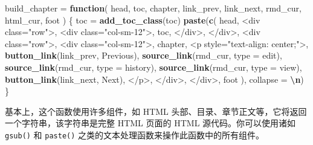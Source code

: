 \documentclass[
  12pt,
]{krantz}
\newenvironment{Shaded}{\begin{snugshade}}{\end{snugshade}}
\newcommand{\AttributeTok}[1]{\textcolor[rgb]{0.13,0.29,0.53}{#1}}
\newcommand{\ControlFlowTok}[1]{\textcolor[rgb]{0.13,0.29,0.53}{\textbf{#1}}}
\newcommand{\FunctionTok}[1]{\textcolor[rgb]{0.13,0.29,0.53}{\textbf{#1}}}
\newcommand{\NormalTok}[1]{#1}
\newcommand{\OtherTok}[1]{\textcolor[rgb]{0.56,0.35,0.01}{#1}}
\newcommand{\SpecialCharTok}[1]{\textcolor[rgb]{0.81,0.36,0.00}{\textbf{#1}}}
\newcommand{\StringTok}[1]{\textcolor[rgb]{0.31,0.60,0.02}{#1}}
\theoremstyle{definition}
\theoremstyle{definition}
\theoremstyle{definition}
\theoremstyle{definition}
\theoremstyle{remark}
\begin{document}
\begin{Shaded}
\begin{Highlighting}[]
\NormalTok{build\_chapter }\OtherTok{=} \ControlFlowTok{function}\NormalTok{(}
\NormalTok{  head, toc, chapter, link\_prev, link\_next, rmd\_cur, html\_cur, foot}
\NormalTok{) \{}
\NormalTok{  toc }\OtherTok{=} \FunctionTok{add\_toc\_class}\NormalTok{(toc)}
  \FunctionTok{paste}\NormalTok{(}\FunctionTok{c}\NormalTok{(}
\NormalTok{    head,}
    \StringTok{\textquotesingle{}\textless{}div class="row"\textgreater{}\textquotesingle{}}\NormalTok{,}
    \StringTok{\textquotesingle{}\textless{}div class="col{-}sm{-}12"\textgreater{}\textquotesingle{}}\NormalTok{,}
\NormalTok{    toc,}
    \StringTok{\textquotesingle{}\textless{}/div\textgreater{}\textquotesingle{}}\NormalTok{,}
    \StringTok{\textquotesingle{}\textless{}/div\textgreater{}\textquotesingle{}}\NormalTok{,}
    \StringTok{\textquotesingle{}\textless{}div class="row"\textgreater{}\textquotesingle{}}\NormalTok{,}
    \StringTok{\textquotesingle{}\textless{}div class="col{-}sm{-}12"\textgreater{}\textquotesingle{}}\NormalTok{,}
\NormalTok{    chapter,}
    \StringTok{\textquotesingle{}\textless{}p style="text{-}align: center;"\textgreater{}\textquotesingle{}}\NormalTok{,}
    \FunctionTok{button\_link}\NormalTok{(link\_prev, }\StringTok{\textquotesingle{}Previous\textquotesingle{}}\NormalTok{),}
    \FunctionTok{source\_link}\NormalTok{(rmd\_cur, }\AttributeTok{type =} \StringTok{\textquotesingle{}edit\textquotesingle{}}\NormalTok{),}
    \FunctionTok{source\_link}\NormalTok{(rmd\_cur, }\AttributeTok{type =} \StringTok{\textquotesingle{}history\textquotesingle{}}\NormalTok{),}
    \FunctionTok{source\_link}\NormalTok{(rmd\_cur, }\AttributeTok{type =} \StringTok{\textquotesingle{}view\textquotesingle{}}\NormalTok{),}
    \FunctionTok{button\_link}\NormalTok{(link\_next, }\StringTok{\textquotesingle{}Next\textquotesingle{}}\NormalTok{),}
    \StringTok{\textquotesingle{}\textless{}/p\textgreater{}\textquotesingle{}}\NormalTok{,}
    \StringTok{\textquotesingle{}\textless{}/div\textgreater{}\textquotesingle{}}\NormalTok{,}
    \StringTok{\textquotesingle{}\textless{}/div\textgreater{}\textquotesingle{}}\NormalTok{,}
\NormalTok{    foot}
\NormalTok{  ), }\AttributeTok{collapse =} \StringTok{\textquotesingle{}}\SpecialCharTok{\textbackslash{}n}\StringTok{\textquotesingle{}}\NormalTok{)}
\NormalTok{\}}
\end{Highlighting}
\end{Shaded}

基本上，这个函数使用许多组件，如 HTML 头部、目录、章节正文等，它将返回一个字符串，该字符串是完整 HTML 页面的 HTML 源代码。你可以使用诸如 \texttt{gsub()} 和 \texttt{paste()} 之类的文本处理函数来操作此函数中的所有组件。
\end{document}
